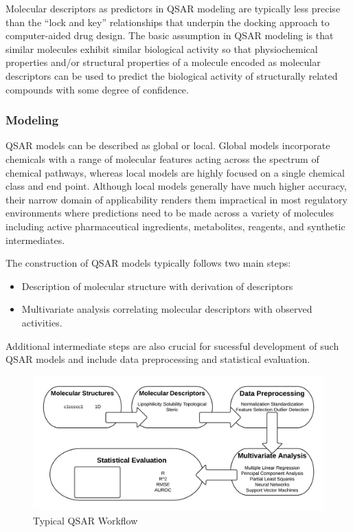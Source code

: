 Molecular descriptors as predictors in QSAR modeling are typically less precise than the “lock and key” relationships that underpin the docking approach to computer-aided drug design. The basic assumption in QSAR modeling is that similar molecules exhibit similar biological activity so that physiochemical properties and/or structural properties of a molecule encoded as molecular descriptors can be used to predict the biological activity of structurally related compounds with some degree of confidence.

\subsubsection{Modeling}
QSAR models can be described as global or local. Global models incorporate chemicals with a range of molecular features acting across the spectrum of chemical pathways, whereas local models are highly focused on a single chemical class and end point. Although local models generally have much higher accuracy, their narrow domain of applicability renders them impractical in most regulatory environments where predictions need to be made across a variety of molecules including active pharmaceutical ingredients, metabolites, reagents, and synthetic intermediates. \cite{Kruhlak2012}

The construction of QSAR models typically follows two main steps:
\begin{itemize}
\item Description of molecular structure with derivation of descriptors
\item Multivariate analysis correlating molecular descriptors with observed activities. 
\end{itemize}
Additional intermediate steps are also crucial for sucessful development of such QSAR models and include data preprocessing and statistical evaluation. \cite{Nantasenamat2009}

\begin{figure}[h,t]
  \caption{Typical QSAR Workflow}
  \centering
  \includegraphics[width=1\textwidth]{../img/Typical_QSAR_Process.png}
\end{figure}

